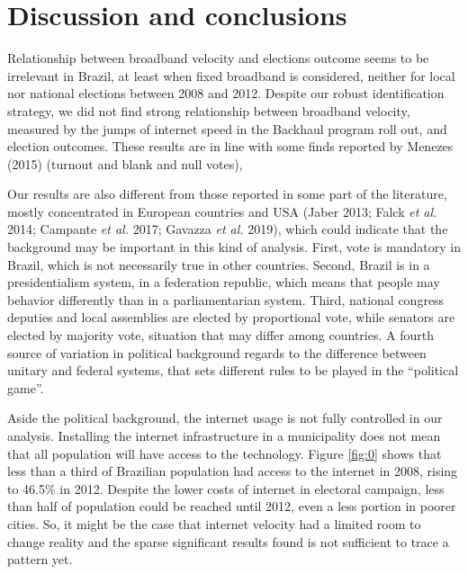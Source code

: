 \documentclass[
  12pt,
]{article}
\begin{document}
\hypertarget{discussion-and-conclusions}{%
\section{Discussion and conclusions}\label{discussion-and-conclusions}}

Relationship between broadband velocity and elections outcome seems to
be irrelevant in Brazil, at least when fixed broadband is considered,
neither for local nor national elections between 2008 and 2012. Despite
our robust identification strategy, we did not find strong relationship
between broadband velocity, measured by the jumps of internet speed in
the Backhaul program roll out, and election outcomes. These results are
in line with some finds reported by Menezes (2015) (turnout and blank
and null votes),

Our results are also different from those reported in some part of the
literature, mostly concentrated in European countries and USA (Jaber
2013; Falck \emph{et al.} 2014; Campante \emph{et al.} 2017; Gavazza
\emph{et al.} 2019), which could indicate that the background may be
important in this kind of analysis. First, vote is mandatory in Brazil,
which is not necessarily true in other countries. Second, Brazil is in a
presidentialism system, in a federation republic, which means that
people may behavior differently than in a parliamentarian system. Third,
national congress deputies and local assemblies are elected by
proportional vote, while senators are elected by majority vote,
situation that may differ among countries. A fourth source of variation
in political background regards to the difference between unitary and
federal systems, that sets different rules to be played in the
``political game''.

Aside the political background, the internet usage is not fully
controlled in our analysis. Installing the internet infrastructure in a
municipality does not mean that all population will have access to the
technology. Figure \ref{fig:0} shows that less than a third of Brazilian
population had access to the internet in 2008, rising to 46.5\% in 2012.
Despite the lower costs of internet in electoral campaign, less than
half of population could be reached until 2012, even a less portion in
poorer cities. So, it might be the case that internet velocity had a
limited room to change reality and the sparse significant results found
is not sufficient to trace a pattern yet.
\end{document}
